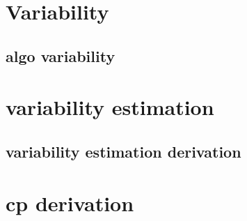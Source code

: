 \documentclass{article}
\begin{document}


\newpage
\section{Variability}

\subsection{algo variability}
\label{algo_variability}





\newpage
\section{variability estimation}
\subsection{variability estimation derivation}
\label{variability_estimation}




\newpage
\section{cp derivation}
\label{cp_derivation}
\todo{}






\end{document}
